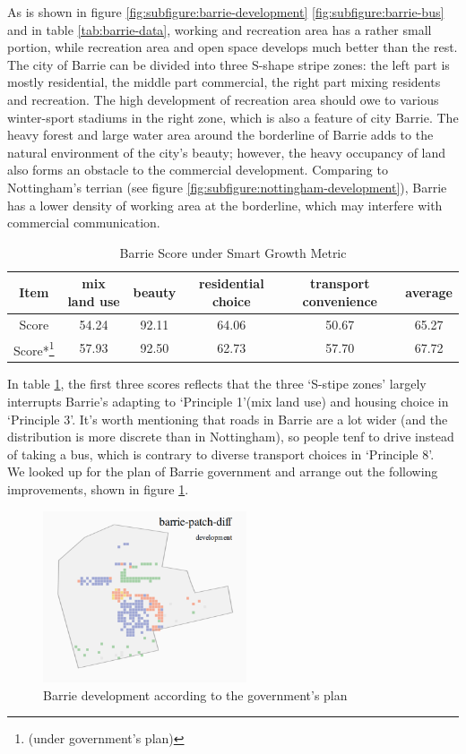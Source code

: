 As is shown in figure \ref{fig:subfigure:barrie-development} \ref{fig:subfigure:barrie-bus} and in table \ref{tab:barrie-data}, working and recreation area has a rather small portion, while recreation area and open space develops much better than the rest.
The city of Barrie can be divided into three S-shape stripe zones: the left part is mostly residential, the middle part commercial, the right part mixing residents and recreation.
The high development of recreation area should owe to various winter-sport stadiums in the right zone, which is also a feature of city Barrie.
The heavy forest and large water area around the borderline of Barrie adds to the natural environment of the city's beauty; however, the heavy occupancy of land also forms an obstacle to the commercial development.
Comparing to Nottingham's terrian (see figure \ref{fig:subfigure:nottingham-development}), Barrie has a lower density of working area at the borderline, which may interfere with commercial communication.
\\
\begin{table}
  \begin{tabular}{c|cccc|c}
    \hline
    Item & mix land use & beauty & residential choice & transport convenience & average \\
    \hline
    Score & 54.24 & 92.11 & 64.06 & 50.67 & 65.27 \\
    Score*\footnote{(under government's plan)} & 57.93 & 92.50 & 62.73 & 57.70 & 67.72\\
    \hline
  \end{tabular}
  \caption{Barrie Score under Smart Growth Metric}
  \label{tab:barrie-score}
\end{table}
In table \ref{tab:barrie-score}, the first three scores reflects that the three `S-stipe zones' largely interrupts Barrie's adapting to `Principle 1'(mix land use) and housing choice in `Principle 3'.
It's worth mentioning that roads in Barrie are a lot wider (and the distribution is more discrete than in Nottingham), so people tenf to drive instead of taking a bus, which is contrary to diverse transport choices in `Principle 8'.
\\
We looked up for the plan of Barrie government \cite{pdf:barrie-downtown-plan} \cite{pdf:barrie-waterfront} \cite{pdf:barrie-official-plan} \cite{pdf:barrie-industrial-mapping} and arrange out the following improvements, shown in figure \ref{fig:barrie-patch-diff}.
\begin{figure}[htb]
  \label{fig:barrie-patch-diff}
  \centering
  \includegraphics[width=6cm]{pic/barrie-patch-diff-development.png}
  \caption{Barrie development according to the government's plan}
\end{figure}
